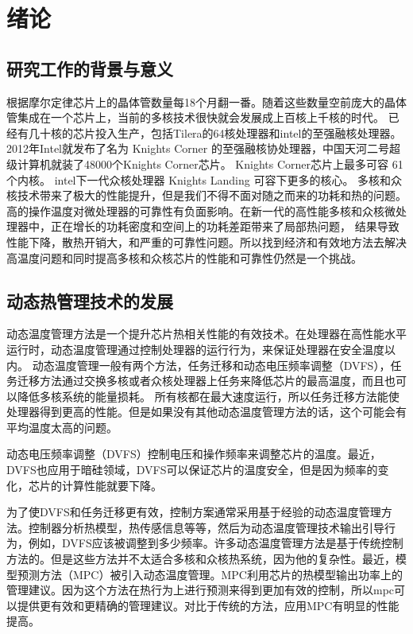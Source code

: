 
\chapter{绪论}
\section{研究工作的背景与意义}\label{sec:mean}
根据摩尔定律芯片上的晶体管数量每18个月翻一番。随着这些数量空前庞大的晶体管集成在一个芯片上，当前的多核技术很快就会发展成上百核上千核的时代\cite{borkar:DAC'07}。
已经有几十核的芯片投入生产，包括Tilera的64核处理器和intel的至强融核处理器。2012年Intel就发布了名为 Knights Corner 的至强融核协处理器，中国天河二号超级计算机就装了48000个Knights Corner芯片。
Knights Corner芯片上最多可容 61个内核。
intel下一代众核处理器 Knights Landing 可容下更多的核心。
多核和众核技术带来了极大的性能提升，但是我们不得不面对随之而来的功耗和热的问题。
高的操作温度对微处理器的可靠性有负面影响。在新一代的高性能多核和众核微处理器中，正在增长的功耗密度和空间上的功耗差距带来了局部热问题，
结果导致性能下降，散热开销大，和严重的可靠性问题。所以找到经济和有效地方法去解决高温度问题和同时提高多核和众核芯片的性能和可靠性仍然是一个挑战。

\section{动态热管理技术的发展}\label{sec:his}

动态温度管理方法是一个提升芯片热相关性能的有效技术。在处理器在高性能水平运行时，动态温度管理通过控制处理器的运行行为，来保证处理器在安全温度以内。
动态温度管理一般有两个方法，任务迁移和动态电压频率调整（DVFS），任务迁移方法通过交换多核或者众核处理器上任务来降低芯片的最高温度，而且也可以降低多核系统的能量损耗。
所有核都在最大速度运行，所以任务迁移方法能使处理器得到更高的性能。但是如果没有其他动态温度管理方法的话，这个可能会有平均温度太高的问题。

 动态电压频率调整（DVFS）控制电压和操作频率来调整芯片的温度。最近，DVFS也应用于暗硅领域，DVFS可以保证芯片的温度安全，但是因为频率的变化，芯片的计算性能就要下降。
 
 为了使DVFS和任务迁移更有效，控制方案通常采用基于经验的动态温度管理方法。控制器分析热模型，热传感信息等等，然后为动态温度管理技术输出引导行为，例如，DVFS应该被调整到多少频率。许多动态温度管理方法是基于传统控制方法的。但是这些方法并不太适合多核和众核热系统，因为他的复杂性。最近，模型预测方法（MPC）被引入动态温度管理。MPC利用芯片的热模型输出功率上的管理建议。因为这个方法在热行为上进行预测来得到更加有效的控制，所以mpc可以提供更有效和更精确的管理建议。对比于传统的方法，应用MPC有明显的性能提高。
 
